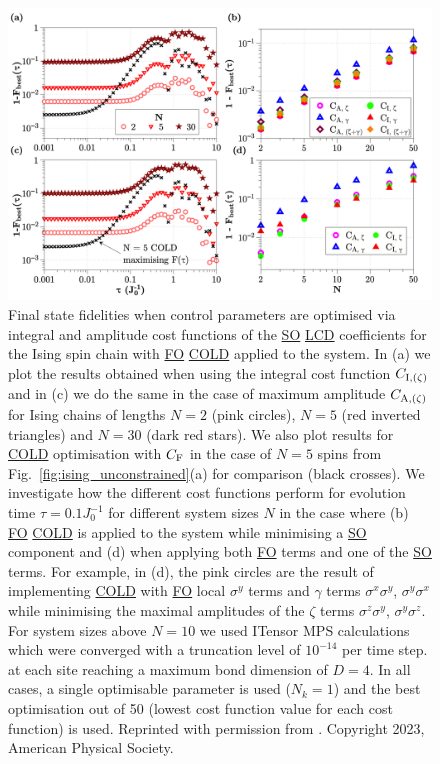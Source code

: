 \documentclass[a4paper,oneside,11pt]{book}
\newcommand{\sx}{\sigma^x}
\newcommand{\sy}{\sigma^y}
\newcommand{\sz}{\sigma^z}
\newcommand{\acrref}[1]{\hyperref[acr:#1]{#1}}
\begin{document}
\begin{figure}[t!]
    \centering
    \includegraphics[width=\linewidth]{images/ising_max_int_plots.png} \caption[Plot of final state fidelity for the Ising spin chain for different cost functions with LCD applied.]{Final state fidelities when control parameters are optimised via integral and amplitude cost functions of the \acrref{SO} \acrref{LCD} coefficients for the Ising spin chain with \acrref{FO} \acrref{COLD} applied to the system. In (a) we plot the results obtained when using the integral cost function $C_{\rm I, (\zeta)}$ and in (c) we do the same in the case of maximum amplitude $C_{\rm A, (\zeta)}$ for Ising chains of lengths $N = 2$ (pink circles), $N = 5$ (red inverted triangles) and $N=30$ (dark red stars). We also plot results for \acrref{COLD} optimisation with $C_{\rm F}$ in the case of $N=5$ spins from Fig.~\ref{fig:ising_unconstrained}(a) for comparison (black crosses). We investigate how the different cost functions perform for evolution time $\tau = 0.1J_0^{-1}$ for different system sizes $N$ in the case where (b) \acrref{FO} \acrref{COLD} is applied to the system while minimising a \acrref{SO} component and (d) when applying both \acrref{FO} terms and one of the \acrref{SO} terms. For example, in (d), the pink circles are the result of implementing \acrref{COLD} with \acrref{FO} local $\sy$ terms and $\gamma$ terms $\sx\sy$, $\sy\sx$ while minimising the maximal amplitudes of the $\zeta$ terms $\sz\sy$, $\sy\sz$. For system sizes above $N=10$ we used ITensor\cite{fishman_itensor_2022} MPS calculations which were converged with a truncation level of $10^{-14}$ per time step. at each site reaching a maximum bond dimension of $D = 4$. In all cases, a single optimisable parameter is used ($N_k = 1$) and the best optimisation out of 50 (lowest cost function value for each cost function) is used. Reprinted with permission from \cite{cepaite_counterdiabatic_2023}. Copyright 2023, American Physical Society.}\label{fig:ising_minimising_ho_mainplot}
\end{figure}
\end{document}
